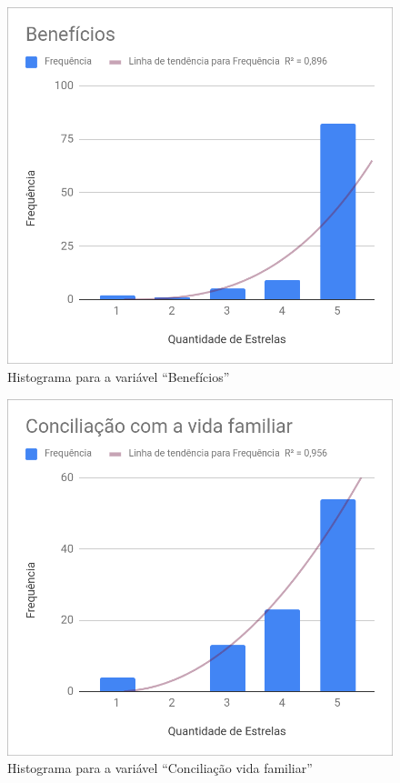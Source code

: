	\begin{figure}[h]
		\centering
		\caption{Histograma para a variável ``Benefícios''}
		\label{fig:beneficios}
		\includegraphics[width=1\linewidth]{img/beneficios}
	\end{figure}
		
	\begin{figure}
		\centering
		\caption{Histograma para a variável ``Conciliação vida familiar''}
		\label{fig:familiar}
		\includegraphics[width=1\linewidth]{img/conc_vida_familiar}
	\end{figure}
	
